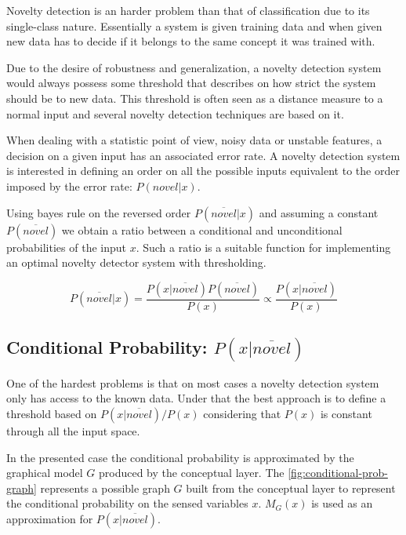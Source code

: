 \documentclass[runningheads,a4paper]{llncs}
\begin{document}
Novelty detection is an harder problem than that of classification due to its single-class nature.
Essentially a system is given training data and when given new data has to decide if it belongs
to the same concept it was trained with.

Due to the desire of robustness and generalization, a novelty detection system would always possess
some threshold that describes on how strict the system should be to new data.
This threshold is often seen as a distance measure to a normal input and several novelty detection
techniques are based on it.

When dealing with a statistic point of view, noisy data or unstable features, a decision on a
given input has an associated error rate. A novelty detection system is interested in defining an
order on all the possible inputs equivalent to the order imposed by the error rate: $P(novel|x)$.

Using bayes rule on the reversed order $P(\overline{novel}|x)$ and assuming a constant $P(\overline{novel})$
we obtain a ratio between a conditional and unconditional probabilities of the input $x$.
Such a ratio is a suitable function for implementing an optimal novelty detector system with
thresholding.

\begin{equation}
\label{eq:novelty-threshold}
          P(\overline{novel}|x)
  =       \frac{P(x|\overline{novel}) P(\overline{novel})}{P(x)}
  \propto \frac{P(x|\overline{novel})}{P(x)}
\end{equation}

\subsection{Conditional Probability: $P(x|\overline{novel})$}
\label{sec:uniform-unconditional}

One of the hardest problems is that on most cases a novelty detection system only has access to 
the known data.
Under that the best approach is to define a threshold based on $P(x|\overline{novel})/P(x)$
considering that $P(x)$ is constant through all the input space.

In the presented case the conditional probability is approximated by the graphical model $G$
produced by the conceptual layer.
The \autoref{fig:conditional-prob-graph} represents a possible graph $G$ built from the conceptual
layer to represent the conditional probability on the sensed variables $x$.
$M_G(x)$ is used as an approximation for $P(x|\overline{novel})$.
\end{document}
